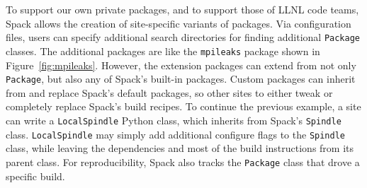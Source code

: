 To support our own private packages, and to support those of LLNL code teams,
Spack allows the creation of site-specific variants of packages.
Via configuration files, users can specify additional search
directories for finding additional {\tt Package} classes.
%
The additional packages are like the {\tt mpileaks} package shown in Figure~\ref{fig:mpileaks}.  However, the extension packages can extend from not
only {\tt Package}, but also any of Spack's built-in packages.
Custom packages can inherit from and replace Spack's default
packages, so other sites to either tweak or completely replace Spack's
build recipes.  To continue the previous example, a site can write
a {\tt LocalSpindle} Python class, which inherits from Spack's
{\tt Spindle} class.  {\tt LocalSpindle} may simply add additional
configure flags to the {\tt Spindle} class, while leaving the
dependencies and most of the build instructions from its parent
class.  For reproducibility, Spack also tracks the {\tt Package}
class that drove a specific build. 






